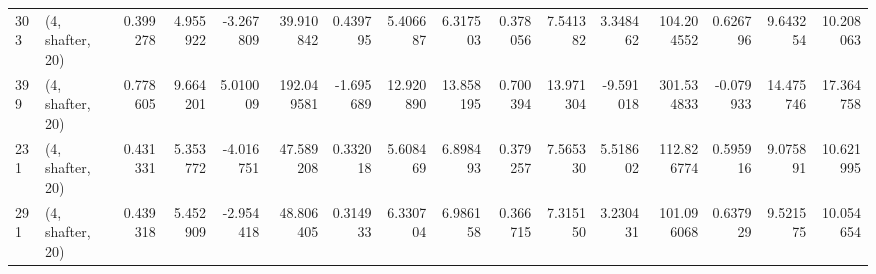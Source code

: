 \begin{tabular}{llrrrrrrrrrrrrrr}
303 &  (4, shafter, 20) &   0.399278 &   4.955922 &  -3.267809 &    39.910842 &   0.439795 &   5.406687 &   6.317503 &  0.378056 &   7.541382 &   3.348462 &   104.204552 &  0.626796 &   9.643254 &  10.208063 \\
399 &  (4, shafter, 20) &   0.778605 &   9.664201 &   5.010009 &   192.049581 &  -1.695689 &  12.920890 &  13.858195 &  0.700394 &  13.971304 &  -9.591018 &   301.534833 & -0.079933 &  14.475746 &  17.364758 \\
231 &  (4, shafter, 20) &   0.431331 &   5.353772 &  -4.016751 &    47.589208 &   0.332018 &   5.608469 &   6.898493 &  0.379257 &   7.565330 &   5.518602 &   112.826774 &  0.595916 &   9.075891 &  10.621995 \\
291 &  (4, shafter, 20) &   0.439318 &   5.452909 &  -2.954418 &    48.806405 &   0.314933 &   6.330704 &   6.986158 &  0.366715 &   7.315150 &   3.230431 &   101.096068 &  0.637929 &   9.521575 &  10.054654 \\
\bottomrule
\end{tabular}
